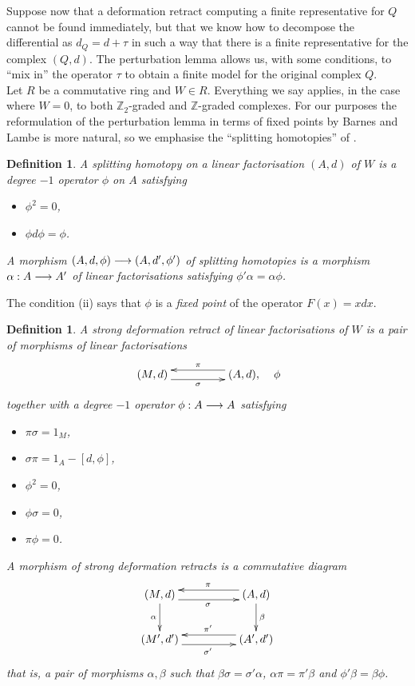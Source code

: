 \documentclass[english,letter paper,12pt,leqno]{article}
\theoremstyle{example}
\newtheorem{definition}[theorem]{Definition}
\numberwithin{equation}{section}
\begin{document}
Suppose now that a deformation retract computing a finite representative for $Q$ cannot be found immediately, but that we know how to decompose the differential as $d_Q = d + \tau$ in such a way that there is a finite representative for the complex $(Q,d)$. The perturbation lemma allows us, with some conditions, to ``mix in'' the operator $\tau$ to obtain a finite model for the original complex $Q$.
\\

Let $R$ be a commutative ring and $W \in R$. Everything we say applies, in the case where $W = 0$, to both $\mathbb{Z}_2$-graded and $\mathbb{Z}$-graded complexes.  For our purposes the reformulation of the perturbation lemma in terms of fixed points by Barnes and Lambe is more natural, so we emphasise the ``splitting homotopies'' of \cite{barneslambe}.

\begin{definition} A \emph{splitting homotopy} on a linear factorisation $(A,d)$ of $W$ is a degree $-1$ operator $\phi$ on $A$ satisfying
\begin{itemize}
\item[(i)] $\phi^2 = 0$,
\item[(ii)] $\phi d \phi = \phi$.
\end{itemize}
A \emph{morphism} $(A,d, \phi) \longrightarrow (A,d',\phi')$ of splitting homotopies is a morphism $\alpha: A \longrightarrow A'$ of linear factorisations satisfying $\phi' \alpha = \alpha \phi$.
\end{definition}

The condition (ii) says that $\phi$ is a \emph{fixed point} of the operator $F(x) = x d x$.

\begin{definition} A \emph{strong deformation retract} of linear factorisations of $W$ is a pair of morphisms of linear factorisations
\begin{equation}\label{eq:defn_sdr}
\xymatrix@C+2pc{
(M,d) \ar@<-1ex>[r]_\sigma & (A,d), \ar@<-1ex>[l]_\pi
} \quad \phi
\end{equation}
together with a degree $-1$ operator $\phi: A \longrightarrow A$ satisfying
\begin{itemize}
\item[(i)] $\pi \sigma = 1_M$,
\item[(ii)] $\sigma \pi = 1_A - [d, \phi]$,
\item[(iii)] $\phi^2 = 0$,
\item[(iv)] $\phi \sigma = 0$,
\item[(v)] $\pi \phi = 0$.
\end{itemize}
A \emph{morphism} of strong deformation retracts is a commutative diagram
\[
\xymatrix@C+2pc{
(M,d) \ar[d]_{\alpha} \ar@<-1ex>[r]_\sigma & (A,d)\ar[d]^\beta \ar@<-1ex>[l]_\pi\\
(M',d') \ar@<-1ex>[r]_{\sigma'} & (A',d') \ar@<-1ex>[l]_{\pi'}
}
\]
that is, a pair of morphisms $\alpha, \beta$ such that $\beta \sigma = \sigma' \alpha$, $\alpha \pi = \pi' \beta$ and $\phi' \beta = \beta \phi$.
\end{definition}
\end{document}
